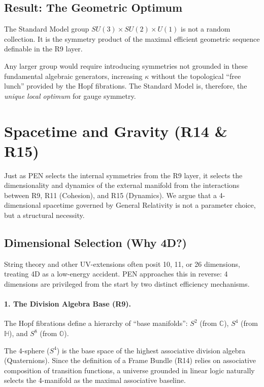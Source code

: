 \documentclass[12pt,a4paper]{article}
\theoremstyle{definition}
\newcommand{\C}{\mathbb{C}}
\newcommand{\HH}{\mathbb{H}}
\newcommand{\OO}{\mathbb{O}}
\newcommand{\kap}{\kappa}
\newcommand{\SM}{SU(3) \times SU(2) \times U(1)}
\begin{document}
\subsection{Result: The Geometric Optimum}

The Standard Model group $\SM$ is not a random collection. It is the symmetry product of the maximal efficient geometric sequence definable in the R9 layer.

Any larger group would require introducing symmetries not grounded in these fundamental algebraic generators, increasing $\kap$ without the topological ``free lunch'' provided by the Hopf fibrations. The Standard Model is, therefore, the \emph{unique local optimum} for gauge symmetry.

\section{Spacetime and Gravity (R14 \& R15)}

Just as PEN selects the internal symmetries from the R9 layer, it selects the dimensionality and dynamics of the external manifold from the interactions between R9, R11 (Cohesion), and R15 (Dynamics). We argue that a 4-dimensional spacetime governed by General Relativity is not a parameter choice, but a structural necessity.

\subsection{Dimensional Selection (Why 4D?)}

String theory and other UV-extensions often posit 10, 11, or 26 dimensions, treating 4D as a low-energy accident. PEN approaches this in reverse: 4 dimensions are privileged from the start by two distinct efficiency mechanisms.

\paragraph{1. The Division Algebra Base (R9).}
The Hopf fibrations define a hierarchy of ``base manifolds'': $S^2$ (from $\C$), $S^4$ (from $\HH$), and $S^8$ (from $\OO$).

The 4-sphere ($S^4$) is the base space of the highest associative division algebra (Quaternions). Since the definition of a Frame Bundle (R14) relies on associative composition of transition functions, a universe grounded in linear logic naturally selects the 4-manifold as the maximal associative baseline.
\end{document}
